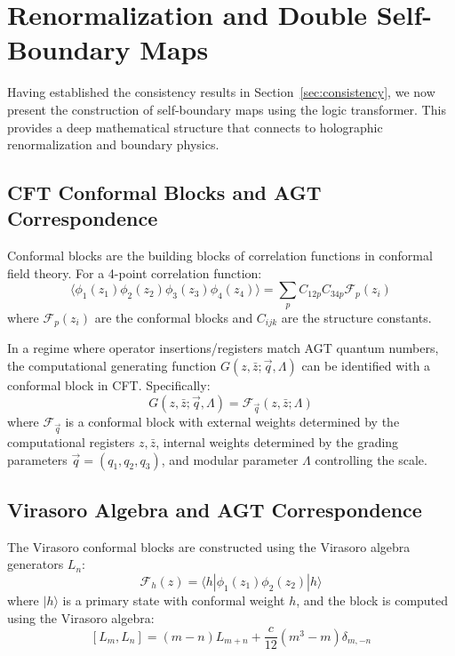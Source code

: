 \section{Renormalization and Double Self-Boundary Maps}
\label{sec:boundary-maps}

Having established the consistency results in Section~\ref{sec:consistency}, we now present the construction of self-boundary maps using the logic transformer. This provides a deep mathematical structure that connects to holographic renormalization and boundary physics.

\subsection{CFT Conformal Blocks and AGT Correspondence}

\begin{definition}
\label{def:conformal-blocks}
Conformal blocks are the building blocks of correlation functions in conformal field theory. For a 4-point correlation function:
\[
\langle \phi_1(z_1) \phi_2(z_2) \phi_3(z_3) \phi_4(z_4) \rangle = \sum_p C_{12p} C_{34p} \mathcal{F}_p(z_i)
\]
where $\mathcal{F}_p(z_i)$ are the conformal blocks and $C_{ijk}$ are the structure constants.
\end{definition}

\begin{proposition}
\label{thm:generating-conformal}
In a regime where operator insertions/registers match AGT quantum numbers, the computational generating function $G(z, \bar{z}; \vec{q}, \Lambda)$ can be identified with a conformal block in CFT. Specifically:
\[
G(z, \bar{z}; \vec{q}, \Lambda) = \mathcal{F}_{\vec{q}}(z, \bar{z}; \Lambda)
\]
where $\mathcal{F}_{\vec{q}}$ is a conformal block with external weights determined by the computational registers $z, \bar{z}$, internal weights determined by the grading parameters $\vec{q} = (q_1, q_2, q_3)$, and modular parameter $\Lambda$ controlling the scale.
\end{proposition}

\subsection{Virasoro Algebra and AGT Correspondence}

\begin{definition}
\label{def:virasoro-blocks}
The Virasoro conformal blocks are constructed using the Virasoro algebra generators $L_n$:
\[
\mathcal{F}_h(z) = \langle h | \phi_1(z_1) \phi_2(z_2) | h \rangle
\]
where $|h\rangle$ is a primary state with conformal weight $h$, and the block is computed using the Virasoro algebra:
\[
[L_m, L_n] = (m-n)L_{m+n} + \frac{c}{12}(m^3-m)\delta_{m,-n}
\]
\end{definition}


